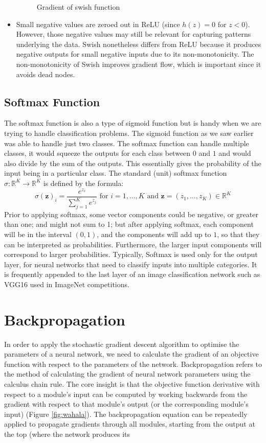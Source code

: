 \documentclass[12pt]{report}
\numberwithin{equation}{section}
\begin{document}
\begin{itemize}[label=-]
\begin{figure}[htb!]
\caption{Gradient of swish function}
\label{fig:swish_prime}
\end{figure}
\item Small negative values are zeroed out in ReLU (since $h(z) = 0$ for $z < 0$). However, those negative values may still be relevant for capturing patterns underlying the data. Swish nonetheless differs from ReLU  because it produces negative outputs for small negative inputs due to its non-monotonicity. The non-monotonicity of Swish improves gradient flow, which is important since it avoids dead nodes.
\end{itemize}

\subsection{Softmax Function}
The softmax function is also a type of sigmoid function but is handy when we are trying to handle classification problems. The sigmoid function as we saw earlier was able to handle just two classes. The softmax function can handle multiple classes, it would squeeze the outputs for each class between $0$ and $1$ and would also divide by the sum of the outputs. This essentially gives the probability of the input being in a particular class. The standard (unit) softmax function $\sigma :\mathbb{R}^{K}\to \mathbb{R}^{K}$ is defined by the formula:
\begin{equation}\label{eqn:softmax}
\sigma (\bm{z} )_{i}={\frac {e^{z_{i}}}{\sum _{j=1}^{K}e^{z_{j}}}}{\text{ for }}i=1,\dotsc ,K{\text{ and }}\bm{z} =(z_{1},\dotsc ,z_{K})\in \mathbb {R} ^{K}
\end{equation}
Prior to applying softmax, some vector components could be negative, or greater than one; and might not sum to 1; but after applying softmax, each component will be in the interval $(0,1)$, and the components will add up to $1$, so that they can be interpreted as probabilities. Furthermore, the larger input components will correspond to larger probabilities. Typically, Softmax is used only for the output layer, for neural networks that need to classify inputs into multiple categories. It is frequently appended to the last layer of an image classification network such as  VGG16 used in ImageNet competitions.

\section{Backpropagation}
In order to apply the stochastic gradient descent algorithm to optimise the parameters of a neural network, we need to calculate the gradient of an objective function with respect to the parameters of the network. Backpropagation refers to the method of calculating the gradient of neural network parameters using the calculus chain rule. The core insight is that the objective function derivative with respect to a module's input can be computed by working backwards from the gradient with respect to that module's output (or the corresponding module's input) (Figure \ref{fig:wahala}). The backpropagation equation can be repeatedly applied to propagate gradients through all modules, starting from the output at the top (where the network produces its 
\end{document}
